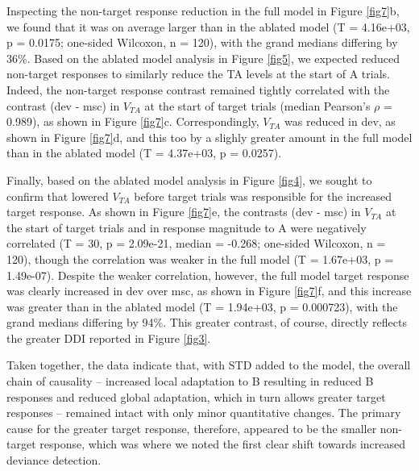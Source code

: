 \documentclass[pdflatex,referee,iicol,sn-basic]{sn-jnl}
\theoremstyle{thmstyleone}%
\theoremstyle{thmstyletwo}%
\theoremstyle{thmstylethree}%
\begin{document}
Inspecting the non-target response reduction in the full model in Figure \ref{fig7}b, we found that it was on average larger than in the ablated model (T = 4.16e+03, p = 0.0175; one-sided Wilcoxon, n = 120), with the grand medians differing by 36\%. Based on the ablated model analysis in Figure \ref{fig5}, we expected reduced non-target responses to similarly reduce the TA levels at the start of A trials. Indeed, the non-target response contrast remained tightly correlated with the contrast (dev - msc) in $V_{TA}$ at the start of target trials (median Pearson's $\rho$ = 0.989), as shown in Figure \ref{fig7}c. Correspondingly, $V_{TA}$ was reduced in dev, as shown in Figure \ref{fig7}d, and this too by a slighly greater amount in the full model than in the ablated model (T = 4.37e+03, p = 0.0257).

Finally, based on the ablated model analysis in Figure \ref{fig4}, we sought to confirm that lowered $V_{TA}$ before target trials was responsible for the increased target response. As shown in Figure \ref{fig7}e, the contrasts (dev - msc) in $V_{TA}$ at the start of target trials and in response magnitude to A were negatively correlated (T = 30, p = 2.09e-21, median = -0.268; one-sided Wilcoxon, n = 120), though the correlation was weaker in the full model (T = 1.67e+03, p = 1.49e-07). Despite the weaker correlation, however, the full model target response was clearly increased in dev over msc, as shown in Figure \ref{fig7}f, and this increase was greater than in the ablated model (T = 1.94e+03, p = 0.000723), with the grand medians differing by 94\%. This greater contrast, of course, directly reflects the greater DDI reported in Figure \ref{fig3}.

Taken together, the data indicate that, with STD added to the model, the overall chain of causality -- increased local adaptation to B resulting in reduced B responses and reduced global adaptation, which in turn allows greater target responses -- remained intact with only minor quantitative changes. The primary cause for the greater target response, therefore, appeared to be the smaller non-target response, which was where we noted the first clear shift towards increased deviance detection.
\end{document}
